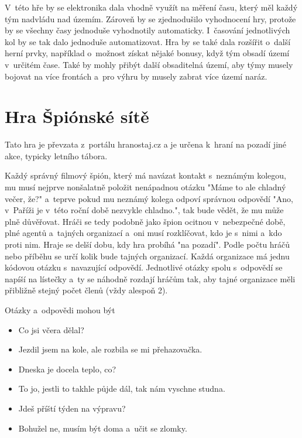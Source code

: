 V~této hře by se elektronika dala vhodně využít na měření času, který měl každý tým nadvládu nad územím.
Zároveň by se zjednodušilo vyhodnocení hry, protože by se všechny časy jednoduše vyhodnotily automaticky.
I~časování jednotlivých kol by se tak dalo jednoduše automatizovat.
Hra by se také dala rozšířit o~další herní prvky, například o~možnost získat nějaké bonusy, když tým obsadí území v~určitém čase.
Také by mohly přibýt další obsaditelná území, aby týmy musely bojovat na více frontách a~pro výhru by musely zabrat více území naráz.

\section{Hra Špiónské sítě \label{SpionskeSite}}
Tato hra je převzata z~portálu hranostaj.cz \cite{SpionskeSite} a je určena k~hraní na pozadí jiné akce, typicky letního tábora.

Každý správný filmový špión, který má navázat kontakt s~neznámým kolegou, mu musí nejprve nonšalatně položit nenápadnou otázku "Máme to ale chladný večer, že?" a~teprve pokud mu neznámý kolega odpoví správnou odpovědí "Ano, v~Paříži je v~této roční době nezvykle chladno.", tak bude vědět, že mu může plně důvěřovat.
Hráči se tedy podobně jako špion ocitnou v~nebezpečné době, plné agentů a~tajných organizací a~oni musí rozklíčovat, kdo je s~nimi a~kdo proti nim.
Hraje se delší dobu, kdy hra probíhá "na pozadí". 
Podle počtu hráčů nebo příběhu se určí kolik bude tajných organizací. 
Každá organizace má jednu kódovou otázku s~navazující odpovědí. 
Jednotlivé otázky spolu s~odpovědí se napíší na lístečky a~ty se náhodně rozdají hráčům tak, aby tajné organizace měli přibližně stejný počet členů (vždy alespoň 2).

Otázky a~odpovědi mohou být
\begin{itemize}
    \item Co jsi včera dělal?
    \item Jezdil jsem na kole, ale rozbila se mi přehazovačka.
\end{itemize}

\begin{itemize}
    \item Dneska je docela teplo, co?
    \item To jo, jestli to takhle půjde dál, tak nám vyschne studna.
\end{itemize}

\begin{itemize}
    \item Jdeš příští týden na výpravu?
    \item Bohužel ne, musím být doma a~učit se zlomky.
\end{itemize}

